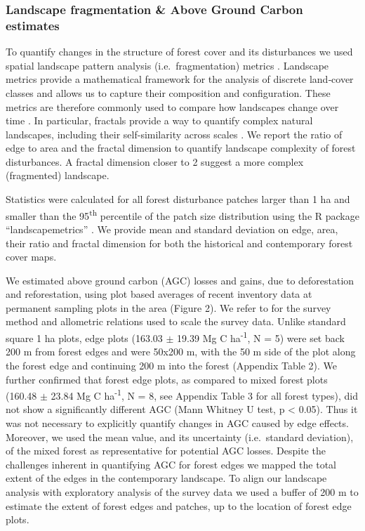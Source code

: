 \documentclass[remote sensing,article,submit,moreauthors,pdftex]{mdpi}
\begin{document}
\hypertarget{landscape-fragmentation-above-ground-carbon-estimates}{%
\subsubsection{Landscape fragmentation \& Above Ground Carbon
estimates}\label{landscape-fragmentation-above-ground-carbon-estimates}}

To quantify changes in the structure of forest cover and its
disturbances we used spatial landscape pattern analysis
(i.e.~fragmentation) metrics \citep{dale1999}. Landscape metrics provide
a mathematical framework for the analysis of discrete land‐cover classes
and allows us to capture their composition and configuration. These
metrics are therefore commonly used to compare how landscapes change
over time \citep{hesselbarth2019}. In particular, fractals provide a way
to quantify complex natural landscapes, including their self-similarity
across scales \citep{Li2000, Mandelbrot1977}. We report the ratio of
edge to area and the fractal dimension to quantify landscape complexity
of forest disturbances. A fractal dimension closer to 2 suggest a more
complex (fragmented) landscape.

Statistics were calculated for all forest disturbance patches larger
than 1 ha and smaller than the 95\textsuperscript{th} percentile of the
patch size distribution using the R package ``landscapemetrics''
\citep{hesselbarth2019}. We provide mean and standard deviation on edge,
area, their ratio and fractal dimension for both the historical and
contemporary \citet{hansen2013} forest cover maps.

We estimated above ground carbon (AGC) losses and gains, due to
deforestation and reforestation, using plot based averages of recent
inventory data at permanent sampling plots in the area (Figure 2). We
refer to \citet{Kearsley2013} for the survey method and allometric
relations used to scale the survey data. Unlike standard square 1 ha
plots, edge plots (163.03 \(\pm\) 19.39 Mg C ha\textsuperscript{-1}, N =
5) were set back 200 m from forest edges and were 50x200 m, with the 50
m side of the plot along the forest edge and continuing 200 m into the
forest (Appendix Table 2). We further confirmed that forest edge plots,
as compared to mixed forest plots (160.48 \(\pm\) 23.84 Mg C
ha\textsuperscript{-1}, N = 8, see Appendix Table 3 for all forest
types), did not show a significantly different AGC (Mann Whitney U test,
p \textless{} 0.05). Thus it was not necessary to explicitly quantify
changes in AGC caused by edge effects. Moreover, we used the mean value,
and its uncertainty (i.e.~standard deviation), of the mixed forest as
representative for potential AGC losses. Despite the challenges inherent
in quantifying AGC for forest edges we mapped the total extent of the
edges in the contemporary landscape. To align our landscape analysis
with exploratory analysis of the survey data we used a buffer of 200 m
to estimate the extent of forest edges and patches, up to the location
of forest edge plots.
\end{document}
